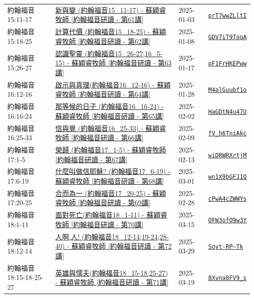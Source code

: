 \documentclass{book}
\begin{document}
{ \scriptsize


\begin{xltabular}{\textwidth}{|p{0.15\textwidth} p{0.6\textwidth}|p{0.07\textwidth} p{0.1\textwidth}|}
\hline
約翰福音 15:11-17 & \hyperref[sec:prT7wwZLltI]{新與變 (約翰福音15\_11-17) - 蘇穎睿牧師 [約翰福音研讀 - 第61講]} & 2025-01-03 & \href{https://youtube.com/watch?v=prT7wwZLltI}{\texttt{prT7wwZLltI}} \\
約翰福音 15:18-25 & \hyperref[sec:GDV7iT9TooA]{計算代價 (約翰福音15\_18-25) - 蘇穎睿牧師 [約翰福音研讀 - 第62講]} & 2025-01-08 & \href{https://youtube.com/watch?v=GDV7iT9TooA}{\texttt{GDV7iT9TooA}} \\
約翰福音 15:26-27 & \hyperref[sec:pF1FrHKEPww]{認識聖靈 (約翰福音15\_26-27;16\_5-15) - 蘇穎睿牧師 [約翰福音研讀 - 第63講]} & 2025-01-17 & \href{https://youtube.com/watch?v=pF1FrHKEPww}{\texttt{pF1FrHKEPww}} \\
約翰福音 16:12-16 & \hyperref[sec:M4alGuubf1o]{啟示與真理(約翰福音16\_12-16) - 蘇穎睿牧師 [約翰福音研讀 - 第64講]} & 2025-01-28 & \href{https://youtube.com/watch?v=M4alGuubf1o}{\texttt{M4alGuubf1o}} \\
約翰福音 16:16-24 & \hyperref[sec:HaGDtN4u47U]{那等候的日子 (約翰福音16\_16-24) - 蘇穎睿牧師 [約翰福音研讀 - 第65講]} & 2025-02-02 & \href{https://youtube.com/watch?v=HaGDtN4u47U}{\texttt{HaGDtN4u47U}} \\
約翰福音 16:25-33 & \hyperref[sec:fV_h6TniAkc]{信與覺 (約翰福音16\_25-33) - 蘇穎睿牧師 [約翰福音研讀 - 第66講]} & 2025-02-09 & \href{https://youtube.com/watch?v=fV_h6TniAkc}{\texttt{fV\_h6TniAkc}} \\
約翰福音 17:1-5 & \hyperref[sec:wiDRWRXrtjM]{榮歸 (約翰福音17\_1-5) - 蘇穎睿牧師 [約翰福音研讀 - 第67講]} & 2025-02-13 & \href{https://youtube.com/watch?v=wiDRWRXrtjM}{\texttt{wiDRWRXrtjM}} \\
約翰福音 17:6-19 & \hyperref[sec:wn1X9bGFJ1Q]{什麼叫做信耶穌? (約翰福音17\_6-19) - 蘇穎睿牧師 [約翰福音研讀 - 第68講]} & 2025-03-01 & \href{https://youtube.com/watch?v=wn1X9bGFJ1Q}{\texttt{wn1X9bGFJ1Q}} \\
約翰福音 17:20-25 & \hyperref[sec:cPwA4cZWWYs]{合而為一 (約翰福音17\_20-25) - 蘇穎睿牧師 [約翰福音研讀 - 第69講]} & 2025-02-28 & \href{https://youtube.com/watch?v=cPwA4cZWWYs}{\texttt{cPwA4cZWWYs}} \\
約翰福音 18:1-11 & \hyperref[sec:OFW3ofO9w3Y]{面對死亡(約翰福音18\_1-11) - 蘇穎睿牧師 [約翰福音研讀 - 第70講]} & 2025-03-15 & \href{https://youtube.com/watch?v=OFW3ofO9w3Y}{\texttt{OFW3ofO9w3Y}} \\
約翰福音 18:12-14 & \hyperref[sec:Soyt_RP__Tk]{人啊,人! (約翰福音18\_12-14;19-24;28-40) - 蘇穎睿牧師 [約翰福音研讀 - 第72講]} & 2025-03-29 & \href{https://youtube.com/watch?v=Soyt-RP--Tk}{\texttt{Soyt-RP--Tk}} \\
約翰福音 18:15-18-25-27 & \hyperref[sec:8Xvna8FV9_s]{英雄與懦夫(約翰福音18\_15-18,25-27) - 蘇穎睿牧師 [約翰福音研讀 - 第71講]} & 2025-03-19 & \href{https://youtube.com/watch?v=8Xvna8FV9_s}{\texttt{8Xvna8FV9\_s}} \\
\hline
\end{xltabular}
}
\newpage
\end{document}
